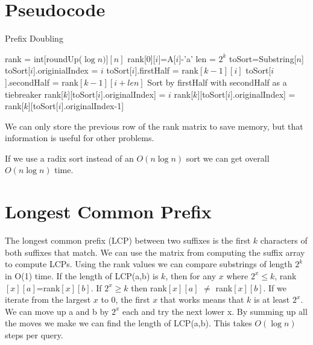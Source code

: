 \documentclass[11pt]{article}
\begin{document}
\section{Pseudocode}

\begin{algorithm}[H]
\caption{Prefix Doubling}
\begin{algorithmic}
    \State rank = int[roundUp($\log n)][n]$
        \State rank[0][$i$]=A[$i$]-'a'
    \EndFor
        \State len = $2^k$
        \State toSort=Substring[$n$]
            \State toSort[$i$].originialIndex = $i$
            \State toSort[$i$].firstHalf = rank$[k-1][i]$
            \State toSort[$i$].secondHalf = rank$[k-1][i+len]$
        \EndFor
        \State Sort by firstHalf with secondHalf as a tiebreaker
                \State rank[$k$][toSort[$i$].originalIndex] = $i$
            \Else 
                \State rank[$k$][toSort[$i$].originalIndex] = rank[$k$][toSort[$i$].originalIndex-1]
            \EndIf
        \EndFor
    \EndFor
\end{algorithmic}
\end{algorithm}

We can only store the previous row of the rank matrix to save memory, but that information is useful for other problems.

If we use a radix sort instead of an $O(n \log n)$ sort we can get overall $O(n \log n)$ time.

\section{Longest Common Prefix}

The longest common prefix (LCP) between two suffixes is the first $k$ characters of both suffixes that match.  We can use the matrix from computing the suffix array to compute LCPs.  Using the rank values we can compare substrings of length $2^k$ in O(1) time.  If the length of LCP(a,b) is $k$, then for any $x$ where $2^x \leq k$, rank$[x][a]$=rank$[x][b]$.  If $2^x \geq k$ then rank$[x][a]$ $\neq$ rank$[x][b]$.  If we iterate from the largest $x$ to 0, the first $x$ that works means that $k$ is at least $2^x$.  We can move up a and b by $2^x$ each and try the next lower x.  By summing up all the moves we make we can find the length of LCP(a,b).  This takes $O(\log n)$ steps per query.
\end{document}
